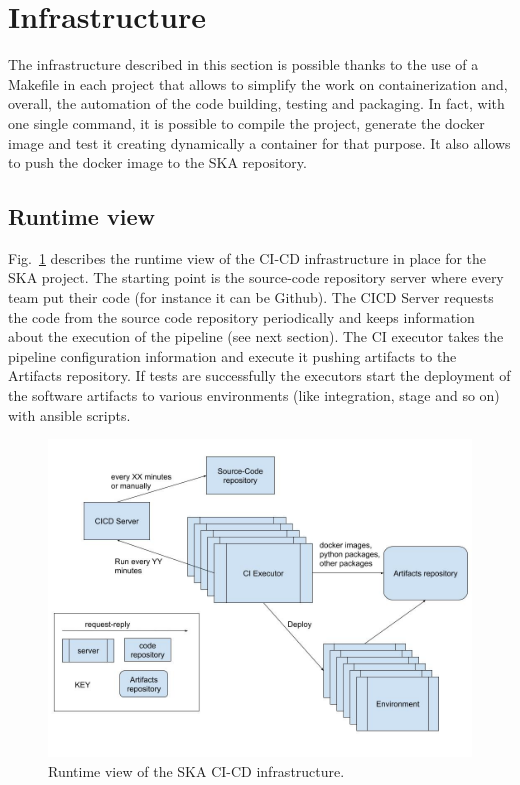 \documentclass[a4paper,
               keeplastbox,   %
               ]{jacow}
\begin{document}
\section{Infrastructure}
The infrastructure described in this section is possible thanks to the use of a Makefile in each project that allows to simplify the work on containerization and, overall, the automation of the code building, testing and packaging. In fact, with one single command, it is possible to compile the project, generate the docker image and test it creating dynamically a container for that purpose.  It also allows to push the docker image to the SKA repository. 
\subsection{Runtime view}
Fig.~\ref{fig:cicdInfra} describes the runtime view of the CI-CD infrastructure in place for the SKA project. The starting point is the source-code repository server where every team put their code (for instance it can be Github). The CICD Server requests the code from the source code repository periodically and keeps information about the execution of the pipeline (see next section).  The CI executor takes the pipeline configuration information and execute it pushing artifacts to the Artifacts repository. If tests are successfully the executors start the deployment of the software artifacts to various environments (like integration, stage and so on) with ansible scripts.
\begin{figure}[!htb]
   \centering
   \includegraphics*[width=1\columnwidth]{cicdInfra}
   \caption{Runtime view of the SKA CI-CD infrastructure.}
   \label{fig:cicdInfra}
\end{figure}
\end{document}
